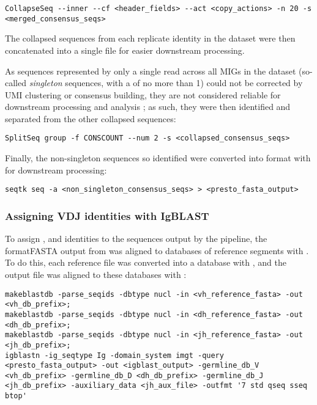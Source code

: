 \begin{lstlisting}
CollapseSeq --inner --cf <header_fields> --act <copy_actions> -n 20 -s <merged_consensus_seqs>
\end{lstlisting}

\noindent The collapsed sequences from each replicate identity in the dataset were then concatenated into a single file for easier downstream processing. 

As sequences represented by only a single read across all MIGs in the dataset (so-called \textit{singleton} sequences, with a  of no more than 1) could not be corrected by UMI clustering or consensus building, they are not considered reliable for downstream processing and analysis \parencite{vanderheiden2018perscomm}; as such, they were then identified and separated from the other collapsed sequences:

\begin{lstlisting}
SplitSeq group -f CONSCOUNT --num 2 -s <collapsed_consensus_seqs>
\end{lstlisting}

\noindent Finally, the non-singleton sequences so identified were converted into  format with  \parencite{li2016seqtk} for downstream processing:

\begin{lstlisting}
seqtk seq -a <non_singleton_consensus_seqs> > <presto_fasta_output>
\end{lstlisting}

\subsubsection{Assigning VDJ identities with IgBLAST}
\label{sec:methods_comp_igpreproc_igblast}

To assign \vh, \dh and \jh identities to the sequences output by the  pipeline, the format{FASTA} output from  was aligned to databases of reference segments with  \parencite{ye2013igblast}. To do this, each reference file was converted into a  database with , and the output  file was aligned to these databases with :

\begin{lstlisting}
makeblastdb -parse_seqids -dbtype nucl -in <vh_reference_fasta> -out <vh_db_prefix>;
makeblastdb -parse_seqids -dbtype nucl -in <dh_reference_fasta> -out <dh_db_prefix>;
makeblastdb -parse_seqids -dbtype nucl -in <jh_reference_fasta> -out <jh_db_prefix>;
igblastn -ig_seqtype Ig -domain_system imgt -query <presto_fasta_output> -out <igblast_output> -germline_db_V <vh_db_prefix> -germline_db_D <dh_db_prefix> -germline_db_J <jh_db_prefix> -auxiliary_data <jh_aux_file> -outfmt '7 std qseq sseq btop'
\end{lstlisting}

